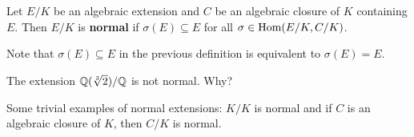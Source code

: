 \chapter{}







\begin{definition}
    Let $E/K$ be an algebraic extension and $C$ be an algebraic closure of $K$ containing $E$. Then $E/K$ is \textbf{normal} if 
    $\sigma(E)\subseteq E$ for all $\sigma\in\operatorname{Hom}(E/K,C/K)$. 
\end{definition}

Note that $\sigma(E)\subseteq E$ in the previous definition
is equivalent to $\sigma(E)=E$. 

\begin{example}
    The extension $\mathbb{Q}(\sqrt[3]{2})/\mathbb{Q}$ is not normal. Why?
\end{example}

Some trivial examples of normal extensions: $K/K$ is normal
and if $C$ is an algebraic closure of $K$, then $C/K$ is normal. 

